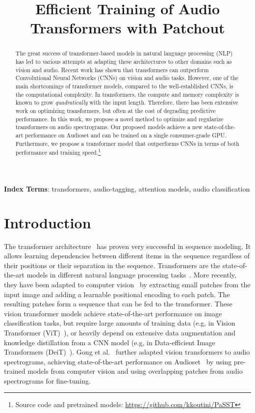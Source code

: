 \documentclass[a4paper]{article}
\title{Efficient Training of Audio Transformers with Patchout}
\begin{document}
\maketitle
\begin{abstract}
The great success of transformer-based models in natural language processing (NLP) has led to various attempts at adapting these architectures to other domains such as vision and audio.
Recent work has shown that transformers can outperform Convolutional Neural Networks (CNNs) on vision and audio tasks. However, one of the main shortcomings of transformer models, compared to the well-established CNNs, is the computational complexity. In transformers, the compute and memory complexity is known to grow \emph{quadratically} with the input length. Therefore, there has been extensive work on optimizing transformers, but often at the cost of degrading predictive performance.
In this work, we propose a novel method to optimize and regularize transformers on audio spectrograms.
Our proposed models achieve a new state-of-the-art performance on Audioset and can be trained on a single consumer-grade GPU. Furthermore, we propose a transformer model that outperforms CNNs in terms of both performance and training speed.\footnote{Source code and pretrained models: \url{https://github.com/kkoutini/PaSST}}
\end{abstract}
\noindent\textbf{Index Terms}: transformers, audio-tagging, attention models, audio classification



\section{Introduction}
\label{sec:intro}





The transformer architecture~\cite{vaswani2017attention} has proven very successful in sequence modeling. It allows learning dependencies between different items in the sequence regardless of their positions or their separation in the sequence. Transformers are the state-of-the-art models in different natural language processing tasks~\cite{devlinCLT19bert,so21Primer,YamadaASTM20luke}. More recently, they have been adapted to computer vision~\cite{dosovitskiyB0WZ21VIT,Liu21swine,ZhuSLLWD21detr} by extracting small patches from the input image and adding a learnable positional encoding to each patch. The resulting patches form a sequence that can be fed to the transformer. These vision transformer models achieve state-of-the-art performance on image classification tasks, but require large amounts of training data (e.g, in Vision Transformer (ViT)~\cite{dosovitskiyB0WZ21VIT}), or heavily depend on extensive data augmentation and knowledge distillation from a CNN model (e.g, in Data-efficient Image Transformers (DeiT)~\cite{TouvronCDMSJ21deit}). Gong et al.~\cite{gong21ast} further adapted vision transformers to audio spectrograms, achieving state-of-the-art performance on Audioset~\cite{audioset2017Gemmeke} by using pre-trained models from computer vision and using overlapping patches from audio spectrograms for fine-tuning.
\end{document}
